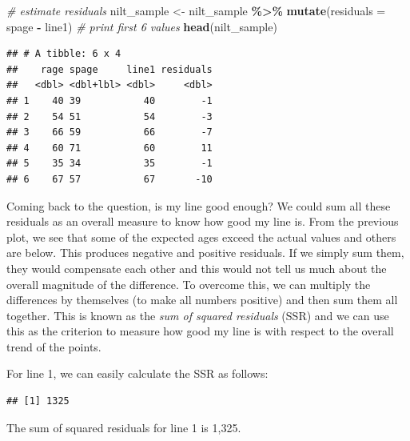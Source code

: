 \documentclass[
]{book}
\newenvironment{Shaded}{\begin{snugshade}}{\end{snugshade}}
\newcommand{\AttributeTok}[1]{\textcolor[rgb]{0.13,0.29,0.53}{#1}}
\newcommand{\CommentTok}[1]{\textcolor[rgb]{0.56,0.35,0.01}{\textit{#1}}}
\newcommand{\DecValTok}[1]{\textcolor[rgb]{0.00,0.00,0.81}{#1}}
\newcommand{\FunctionTok}[1]{\textcolor[rgb]{0.13,0.29,0.53}{\textbf{#1}}}
\newcommand{\NormalTok}[1]{#1}
\newcommand{\OtherTok}[1]{\textcolor[rgb]{0.56,0.35,0.01}{#1}}
\newcommand{\SpecialCharTok}[1]{\textcolor[rgb]{0.81,0.36,0.00}{\textbf{#1}}}
\begin{document}
\begin{Shaded}
\begin{Highlighting}[]
\CommentTok{\# estimate residuals}
\NormalTok{nilt\_sample }\OtherTok{\textless{}{-}}\NormalTok{ nilt\_sample }\SpecialCharTok{\%\textgreater{}\%} 
  \FunctionTok{mutate}\NormalTok{(}\AttributeTok{residuals =}\NormalTok{ spage }\SpecialCharTok{{-}}\NormalTok{ line1)}
\CommentTok{\# print first 6 values}
\FunctionTok{head}\NormalTok{(nilt\_sample)}
\end{Highlighting}
\end{Shaded}

\begin{verbatim}
## # A tibble: 6 x 4
##    rage spage     line1 residuals
##   <dbl> <dbl+lbl> <dbl>     <dbl>
## 1    40 39           40        -1
## 2    54 51           54        -3
## 3    66 59           66        -7
## 4    60 71           60        11
## 5    35 34           35        -1
## 6    67 57           67       -10
\end{verbatim}

Coming back to the question, is my line good enough? We could sum all these residuals as an overall measure to know how good my line is. From the previous plot, we see that some of the expected ages exceed the actual values and others are below. This produces negative and positive residuals. If we simply sum them, they would compensate each other and this would not tell us much about the overall magnitude of the difference. To overcome this, we can multiply the differences by themselves (to make all numbers positive) and then sum them all together. This is known as the \emph{sum of squared residuals} (SSR) and we can use this as the criterion to measure how good my line is with respect to the overall trend of the points.

For line 1, we can easily calculate the SSR as follows:

\begin{Shaded}
\end{Shaded}

\begin{verbatim}
## [1] 1325
\end{verbatim}

The sum of squared residuals for line 1 is 1,325.
\end{document}
